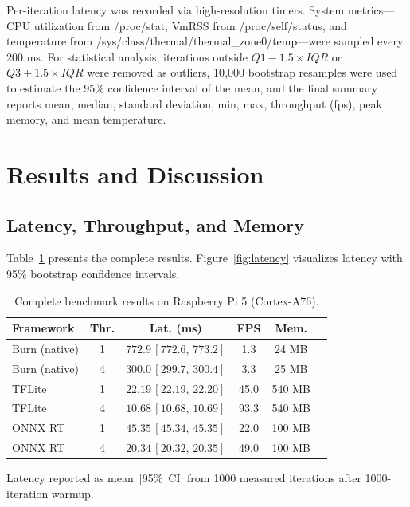 \documentclass[conference]{IEEEtran}
\begin{document}
Per-iteration latency was recorded via high-resolution timers. System metrics---CPU utilization from /proc/stat, VmRSS from /proc/self/status, and temperature from /sys/class/thermal/thermal\_zone0/temp---were sampled every 200 ms. For statistical analysis, iterations outside $Q1 - 1.5 \times IQR$ or $Q3 + 1.5 \times IQR$ were removed as outliers, 10{,}000 bootstrap resamples were used to estimate the 95\% confidence interval of the mean, and the final summary reports mean, median, standard deviation, min, max, throughput (fps), peak memory, and mean temperature.

\section{Results and Discussion}
\label{sec:results}

\subsection{Latency, Throughput, and Memory}

Table~\ref{tab:results} presents the complete results. Figure~\ref{fig:latency} visualizes latency with 95\% bootstrap confidence intervals.

\begin{table}[t]
\centering\footnotesize
\caption{Complete benchmark results on Raspberry Pi 5 (Cortex-A76).}
\label{tab:results}
\begin{tabular}{lccccc}
\toprule
\textbf{Framework} & \textbf{Thr.} & \textbf{Lat. (ms)} & \textbf{FPS} & \textbf{Mem.} \\
\midrule
Burn (native) & 1 & $772.9\,[772.6,\,773.2]$ & 1.3 & 24 MB \\
Burn (native) & 4 & $300.0\,[299.7,\,300.4]$ & 3.3 & 25 MB \\
TFLite & 1 & $22.19\,[22.19,\,22.20]$ & 45.0 & 540 MB \\
TFLite & 4 & $10.68\,[10.68,\,10.69]$ & 93.3 & 540 MB \\
ONNX RT & 1 & $45.35\,[45.34,\,45.35]$ & 22.0 & 100 MB \\
ONNX RT & 4 & $20.34\,[20.32,\,20.35]$ & 49.0 & 100 MB \\
\bottomrule
\end{tabular}
\begin{center}\footnotesize Latency reported as mean~[95\%~CI] from 1000 measured iterations after 1000-iteration warmup.\\\end{center}
\end{table}
\end{document}
